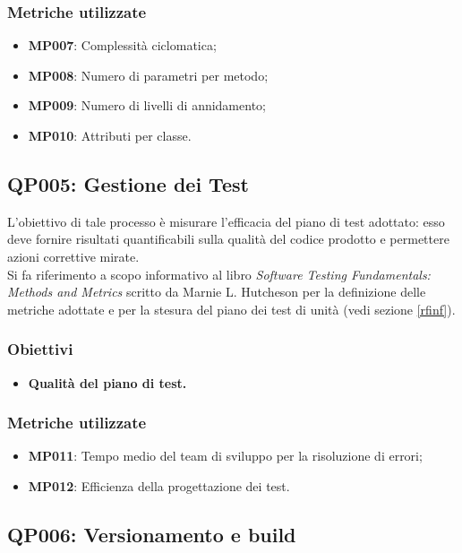 \subsubsection{Metriche utilizzate}

\begin{itemize}
	\item \textbf{MP007}: Complessità ciclomatica;
	\item \textbf{MP008}: Numero di parametri per metodo;
	\item \textbf{MP009}: Numero di livelli di annidamento;
	\item \textbf{MP010}: Attributi per classe.
	
	
\end{itemize}

\subsection{QP005: Gestione dei Test}\label{test}
L'obiettivo di tale processo è misurare l'efficacia del piano di test adottato: esso deve fornire risultati quantificabili sulla qualità del codice prodotto e permettere azioni correttive mirate.\\
Si fa riferimento a scopo informativo al libro \textit{Software Testing Fundamentals: Methods and Metrics} scritto da Marnie L. Hutcheson per la definizione delle metriche adottate e per la stesura del piano dei test di unità (vedi sezione \ref{rfinf}).
\subsubsection{Obiettivi}
\begin{itemize}
	\item \textbf{Qualità del piano di test.} 
\end{itemize}
\subsubsection{Metriche utilizzate}
\begin{itemize}
	\item \textbf{MP011}: Tempo medio del team di sviluppo per la risoluzione di errori;
	\item \textbf{MP012}: Efficienza della progettazione dei test.
\end{itemize}


\subsection{QP006: Versionamento e build}
